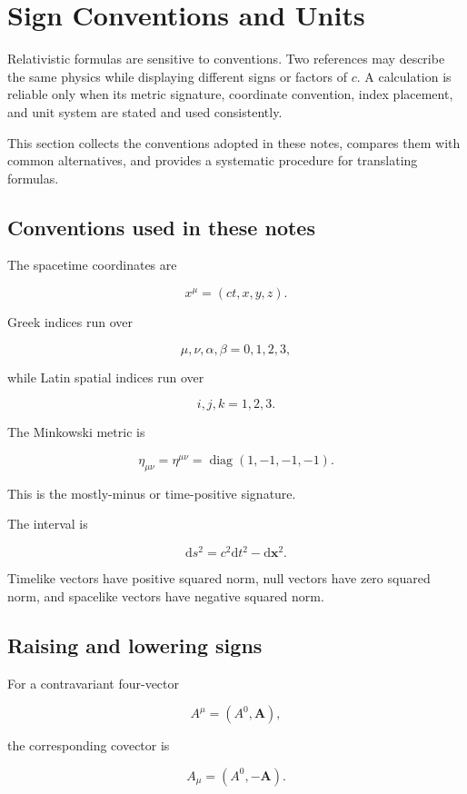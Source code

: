 \section{Sign Conventions and Units}
\label{sec:sign_conventions_and_units}

Relativistic formulas are sensitive to conventions. Two references may describe the same physics while displaying different signs or factors of \(c\). A calculation is reliable only when its metric signature, coordinate convention, index placement, and unit system are stated and used consistently.

This section collects the conventions adopted in these notes, compares them with common alternatives, and provides a systematic procedure for translating formulas.

\subsection{Conventions used in these notes}

The spacetime coordinates are

\[
\boxed{
x^{\mu}=(ct,x,y,z)
}.
\]

Greek indices run over

\[
\mu,\nu,\alpha,\beta=0,1,2,3,
\]

while Latin spatial indices run over

\[
i,j,k=1,2,3.
\]

The Minkowski metric is

\[
\boxed{
\eta_{\mu\nu}
=
\eta^{\mu\nu}
=
\operatorname{diag}(1,-1,-1,-1)
}.
\]

This is the mostly-minus or time-positive signature.

The interval is

\[
\boxed{
\mathrm{d}s^{2}
=
c^{2}\mathrm{d}t^{2}
-
\mathrm{d}\mathbf{x}^{2}
}.
\]

Timelike vectors have positive squared norm, null vectors have zero squared norm, and spacelike vectors have negative squared norm.

\subsection{Raising and lowering signs}

For a contravariant four-vector

\[
A^{\mu}=(A^{0},\mathbf{A}),
\]

the corresponding covector is

\[
\boxed{
A_{\mu}=(A^{0},-\mathbf{A})
}.
\]

